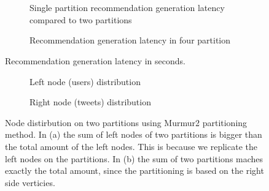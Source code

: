 \chapter{\appendixname}


\begin{figure}[!htb]
    \centering
    \begin{subfigure}{\textwidth}
        \centering
        
        \caption{Single partition recommendation generation latency compared to two partitions}
        \label{plot:recommendation-latency-two-partitions}
    \end{subfigure}\qquad

    \begin{subfigure}{\textwidth}
        \centering
        
        \caption{Recommendation generation latency in four partition}
        \label{plot:recommendation-latency-four-partitions}
    \end{subfigure}\qquad
    \caption{Recommendation generation latency in seconds.}
    \label{plot:recommendation-latency}
\end{figure}

\begin{figure}[!htb]
    \centering
	\begin{subfigure}{0.8\textwidth}
		
		\caption{Left node (users) distribution}
		\label{plot:left-node-distribution-murmur2}
    \end{subfigure}\qquad

    \begin{subfigure}{0.8\textwidth}
		
		\caption{Right node (tweets) distribution}
		\label{plot:right-node-distribution-murmur2}
    \end{subfigure}\qquad
    
    \caption{Node distirbution on two partitions using Murmur2 partitioning method. In (a) the sum of left nodes of two partitions is bigger than the total amount of the left nodes. This is because we replicate the left nodes on the partitions. In (b) the sum of two partitions maches exactly the total amount, since the partitioning is based on the right side verticies.}
\end{figure}


